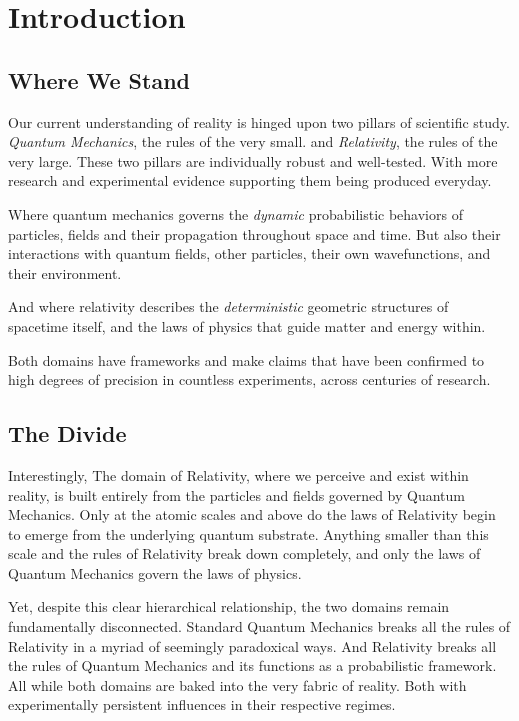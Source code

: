 \documentclass[11pt]{article}
\newcommand{\headertext}{}
\begin{document}
\section{Introduction}
    \renewcommand{\headertext}{(TECH: PoPE)\hspace{1em} SS-2: \hspace{1em}Introduction}
    \subsection{Where We Stand}
        \hspace{1em}
        Our current understanding of reality is hinged upon two pillars of scientific study.
        \emph{Quantum Mechanics}, the rules of the very small.
        and \emph{Relativity}, the rules of the very large.
        These two pillars are individually robust and well-tested.
        With more research and experimental evidence supporting them being produced everyday.

        Where quantum mechanics governs the \emph{dynamic} probabilistic behaviors of particles, fields and their propagation throughout space and time.
        But also their interactions with quantum fields, other particles, their own wavefunctions, and their environment.

        And where relativity describes the \emph{deterministic} geometric structures of spacetime itself, and the laws of physics that guide matter and energy within.

        Both domains have frameworks and make claims that have been confirmed to high degrees of precision in countless experiments, across centuries of research.

    \subsection{The Divide}
        \hspace{1em}
        Interestingly, The domain of Relativity, where we perceive and exist within reality, is built entirely from the particles and fields governed by Quantum Mechanics.
        Only at the atomic scales and above do the laws of Relativity begin to emerge from the underlying quantum substrate.
        Anything smaller than this scale and the rules of Relativity break down completely, and only the laws of Quantum Mechanics govern the laws of physics.

        Yet, despite this clear hierarchical relationship, the two domains remain fundamentally disconnected.
        Standard Quantum Mechanics breaks all the rules of Relativity in a myriad of seemingly paradoxical ways.
        And Relativity breaks all the rules of Quantum Mechanics and its functions as a probabilistic framework.
        All while both domains are baked into the very fabric of reality.
        Both with experimentally persistent influences in their respective regimes.
\end{document}
